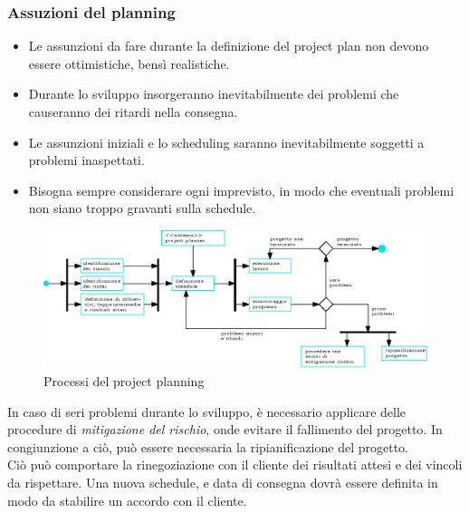 \documentclass[10pt, letterpaper]{report}
\begin{document}
\subsubsection{Assuzioni del planning}\begin{itemize}
    \item Le assunzioni da fare durante la definizione del project plan 
    non devono essere ottimistiche, bensì 
    realistiche.
    \item Durante lo sviluppo insorgeranno inevitabilmente dei problemi che causeranno dei ritardi 
    nella consegna. 
    \item Le assunzioni iniziali e lo scheduling saranno inevitabilmente soggetti a problemi inaspettati.
    \item Bisogna sempre considerare ogni imprevisto, in modo che eventuali problemi non 
    siano troppo gravanti sulla schedule.
\end{itemize}\begin{center}
\begin{figure}[h!]
    \centering 
    \includegraphics[width=1\textwidth ]{images/projectPlanning.eps}
    \caption{Processi del project planning}
\end{figure}\end{center}
In caso di seri problemi durante lo sviluppo, è necessario applicare delle procedure di 
\textit{mitigazione del rischio}, onde evitare il fallimento del progetto. In congiunzione a ciò, 
può essere necessaria la ripianificazione del progetto.\\ 
Ciò può comportare la rinegoziazione con il cliente dei risultati attesi 
e dei vincoli da rispettare. Una nuova schedule, e data di consegna dovrà essere definita in modo 
da stabilire un accordo con il cliente.
\flowerLine 
\end{document}
